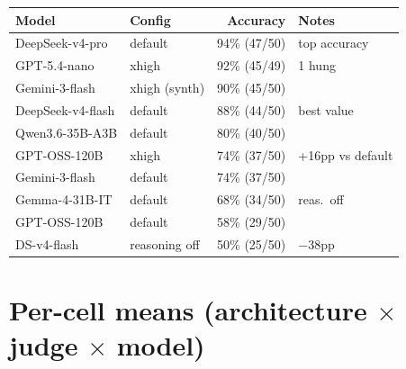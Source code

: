 \documentclass{article}
\begin{document}
\begin{table}[h]
  \centering
  \small
  \begin{tabular}{llrl}
    \toprule
    Model & Config & Accuracy & Notes \\
    \midrule
    DeepSeek-v4-pro & default & 94\% (47/50) & top accuracy \\
    GPT-5.4-nano & xhigh & 92\% (45/49) & 1 hung \\
    Gemini-3-flash & xhigh (synth) & 90\% (45/50) & \\
    DeepSeek-v4-flash & default & 88\% (44/50) & best value \\
    Qwen3.6-35B-A3B & default & 80\% (40/50) & \\
    GPT-OSS-120B & xhigh & 74\% (37/50) & +16pp vs default \\
    Gemini-3-flash & default & 74\% (37/50) & \\
    Gemma-4-31B-IT & default & 68\% (34/50) & reas.\ off \\
    GPT-OSS-120B & default & 58\% (29/50) & \\
    DS-v4-flash & reasoning off & 50\% (25/50) & $-$38pp \\
    \bottomrule
  \end{tabular}
\end{table}

\section{Per-cell means (architecture $\times$ judge $\times$ model)}
\label{app:percell_means}
\end{document}
